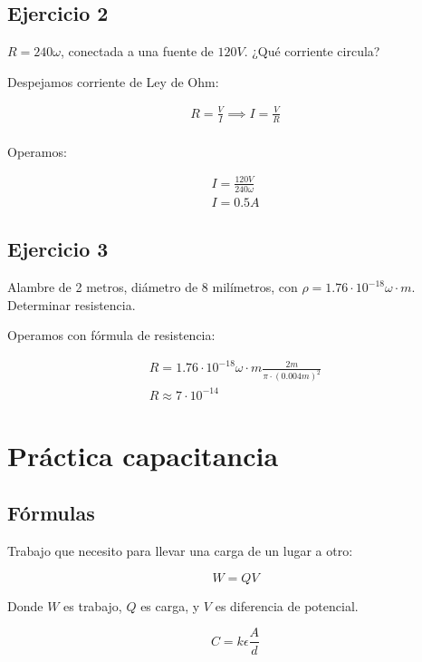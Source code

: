 \subsection{Ejercicio 2}

\(R = 240 \omega\), conectada a una fuente de \(120 V\).
¿Qué corriente circula?

Despejamos corriente de Ley de Ohm:

\begin{align*}
    R = \frac{V}{I} \implies I = \frac{V}{R} \\
\end{align*}

Operamos:

\begin{align*}
    I = \frac{120 V}{240 \omega} \\
    \boxed{I = 0.5A}
\end{align*}

\subsection{Ejercicio 3}

Alambre de 2 metros, diámetro de 8 milímetros,
con \(\rho = 1.76 \cdot 10^{-18} \omega\cdot m\).
Determinar resistencia.

Operamos con fórmula de resistencia:

\begin{align*}
    R = 1.76 \cdot 10^{-18} \omega\cdot m \frac{2 m}{\pi\cdot (0.004 m)^2} \\
    \boxed{R \approx 7\cdot 10^{-14}}
\end{align*}

\section{Práctica capacitancia}

\subsection{Fórmulas}

Trabajo que necesito para llevar una carga de un lugar a otro:

\begin{equation}
    W = QV
\end{equation}

Donde \(W\) es trabajo,
\(Q\) es carga,
y \(V\) es diferencia de potencial.

\begin{equation}
    C=k\epsilon\frac{A}{d}
\end{equation}

